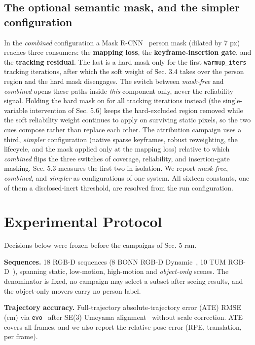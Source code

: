 \subsection{The optional semantic mask, and the simpler configuration}


In the \emph{combined} configuration a Mask R-CNN~\cite{maskrcnn} person mask (dilated by 7 px) reaches three consumers: the \textbf{mapping loss}, the \textbf{keyframe-insertion gate}, and the \textbf{tracking residual}. The last is a hard mask only for the first \texttt{warmup\_iters} tracking iterations, after which the soft weight of Sec. 3.4 takes over the person region and the hard mask disengages. The switch between \emph{mask-free} and \emph{combined} opens these paths inside \emph{this} component only, never the reliability signal. Holding the hard mask on for all tracking iterations instead (the single-variable intervention of Sec. 5.6) keeps the hard-excluded region removed while the soft reliability weight continues to apply on surviving static pixels, so the two cues compose rather than replace each other. The attribution campaign uses a third, \emph{simpler} configuration (native sparse keyframes, robust reweighting, the lifecycle, and the mask applied only at the mapping loss) relative to which \emph{combined} flips the three switches of coverage, reliability, and insertion-gate masking. Sec. 5.3 measures the first two in isolation. We report \emph{mask-free}, \emph{combined}, and \emph{simpler} as configurations of one system. All sixteen constants, one of them a disclosed-inert threshold, are resolved from the run configuration.




\section{Experimental Protocol}


Decisions below were frozen before the campaigns of Sec. 5 ran.


\textbf{Sequences.} 18 RGB-D sequences (8 BONN RGB-D Dynamic~\cite{bonn}, 10 TUM RGB-D~\cite{tumrgbd}), spanning static, low-motion, high-motion and \emph{object-only} scenes. The denominator is fixed, no campaign may select a subset after seeing results, and the object-only movers carry no person label.


\textbf{Trajectory accuracy.} Full-trajectory absolute-trajectory error (ATE) RMSE (cm) via \texttt{evo}~\cite{evo} after SE(3) Umeyama alignment~\cite{umeyama} without scale correction. ATE covers all frames, and we also report the relative pose error (RPE, translation, per frame).


